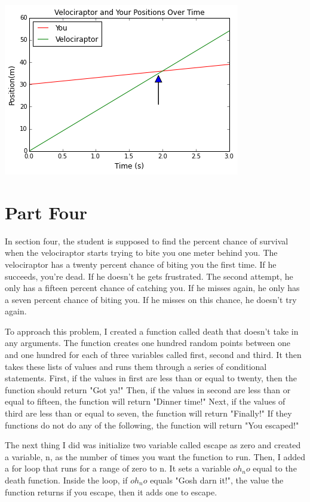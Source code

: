 \documentclass[twocolumn]{revtex4}
\begin{document}
\includegraphics[scale=.6]{graph2.png}


\section{Part Four}
In section four, the student is supposed to find the percent chance of survival when the velociraptor starts trying to bite you one meter behind you. The velociraptor has a twenty percent chance of biting you the first time. If he succeeds, you're dead. If he doesn't he gets frustrated. The second attempt, he only has a fifteen percent chance of catching you. If he misses again, he only has a seven percent chance of biting you. If he misses on this chance, he doesn't try again.

To approach this problem, I created a function called death that doesn't take in any arguments. The function creates one hundred random points between one and one hundred for each of three variables called first, second and third. It then takes these lists of values and runs them through a series of conditional statements. First, if the values in first are less than or equal to twenty, then the function should return "Got ya!" Then, if the values in second are less than or equal to fifteen, the function will return "Dinner time!" Next, if the values of third are less than or equal to seven, the function will return "Finally!" If they functions do not do any of the following, the function will return "You escaped!"

The next thing I did was initialize two variable called escape as zero and created a variable, n, as the number of times you want the function to run. Then, I added a for loop that runs for a range of zero to n. It sets a variable $oh_no$ equal to the death function. Inside the loop, if $oh_no$ equals "Gosh darn it!", the value the function returns if you escape, then it adds one to escape.
\end{document}
